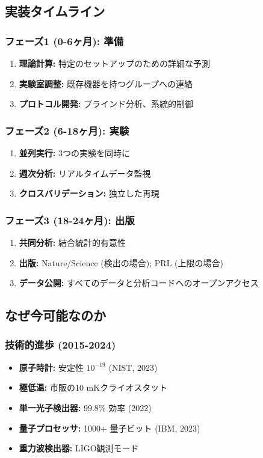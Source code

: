 \documentclass[11pt,a4paper]{article}
\begin{document}
	\subsection{実装タイムライン}
	
	\subsubsection{フェーズ1 (0-6ヶ月): 準備}
	\begin{enumerate}
		\item \textbf{理論計算:} 特定のセットアップのための詳細な予測
		\item \textbf{実験室調整:} 既存機器を持つグループへの連絡
		\item \textbf{プロトコル開発:} ブラインド分析、系統的制御
	\end{enumerate}
	
	\subsubsection{フェーズ2 (6-18ヶ月): 実験}
	\begin{enumerate}
		\item \textbf{並列実行:} 3つの実験を同時に
		\item \textbf{週次分析:} リアルタイムデータ監視
		\item \textbf{クロスバリデーション:} 独立した再現
	\end{enumerate}
	
	\subsubsection{フェーズ3 (18-24ヶ月): 出版}
	\begin{enumerate}
		\item \textbf{共同分析:} 結合統計的有意性
		\item \textbf{出版:} Nature/Science (検出の場合); PRL (上限の場合)
		\item \textbf{データ公開:} すべてのデータと分析コードへのオープンアクセス
	\end{enumerate}
	
	\subsection{なぜ今可能なのか}
	
	\subsubsection{技術的進歩 (2015-2024)}
	\begin{itemize}
		\item \textbf{原子時計:} 安定性 $10^{-19}$ (NIST, 2023)
		\item \textbf{極低温:} 市販の10 mKクライオスタット
		\item \textbf{単一光子検出器:} 99.8\% 効率 (2022)
		\item \textbf{量子プロセッサ:} 1000+ 量子ビット (IBM, 2023)
		\item \textbf{重力波検出器:} LIGO観測モード
	\end{itemize}
	
\end{document}
